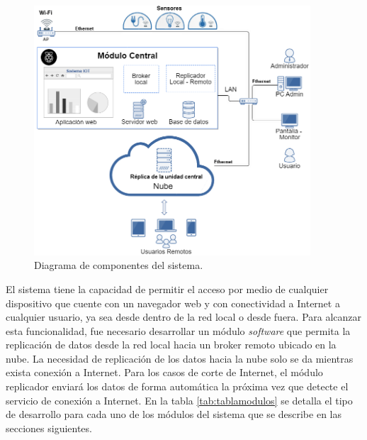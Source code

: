 \begin{figure}[htbp]
	\centering
	\includegraphics[width=0.92\textwidth]{./Figures/diagrama1.png}
	\caption{Diagrama de componentes del sistema.}

	\label{fig:diagrama1}
\end{figure}

El sistema tiene la capacidad de permitir el acceso por medio de cualquier dispositivo que cuente con un navegador web y con conectividad a Internet a cualquier usuario, ya sea desde dentro de la red local o desde fuera. Para alcanzar esta funcionalidad, fue necesario desarrollar un módulo \emph{software} que permita la replicación de datos desde la red local hacia un broker remoto ubicado en la nube. La necesidad de replicación de los datos hacia la nube solo se da mientras exista conexión a Internet. Para los casos de corte de Internet, el módulo replicador enviará los datos de forma automática la próxima vez que detecte el servicio de conexión a Internet. En la tabla \ref{tab:tablamodulos} se detalla el tipo de desarrollo para cada uno de los módulos del sistema  que se describe en las secciones siguientes.

